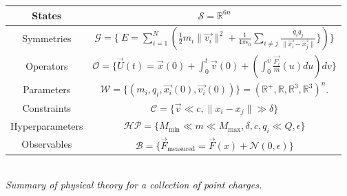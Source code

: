 \documentclass[book.tex]{subfiles}
\begin{document}
\begin{center}
\begin{tabular}{|c|c|}
    \hline
    States & $\mathcal{S} = \mathbb{R}^{6n}$ \\
    \hline
    Symmetries & $\mathcal{G} = \{\
        E = \sum_{i=1}^N \left (\frac{1}{2}m_i \|\vec{v_i}\|^2 + \frac{1}{4\pi \epsilon_0}\sum_{i \neq j} \frac{q_i q_j}{\|\vec{x_i} - \vec{x_j} \|} \} \right )
    \}$  \\
    \hline
    Operators & $\mathcal{O} = \{\vec{U}(t) = \vec{x}(0) + \int_0^t \vec{v}(0) + \left (\int_0^v \frac{\vec{F_i}}{m}(u) du \right ) dv \}$\\
    \hline
    Parameters & $\mathcal{W} = \{(m_i, q_i, \vec{x_i}(0), \vec{v_i}(0))\} = (\mathbb{R}^+, \mathbb{R}, \mathbb{R}^3, \mathbb{R}^3)^n$. \\
    \hline
    Constraints & $\mathcal{C} = \{\vec{v} \ll c, \|x_i - x_j\| \gg \delta \}$ \\
    \hline
    Hyperparameters & $\mathcal{HP} = \{M_{\textrm{min}} \ll m \ll M_{\textrm{max}}, \delta, c, q_i \ll Q, \epsilon\}$ \\
    \hline
    Observables & $\mathcal{B} = \{\vec{F}_{\textrm{measured}} = \vec{F}(x) + \mathcal{N}(0, \epsilon) \}$  \\
    \hline
\end{tabular}
\label{phs:theory:moving:particle}
\\
\textit{Summary of physical theory for a collection of point charges.}
\end{center}
\end{document}
